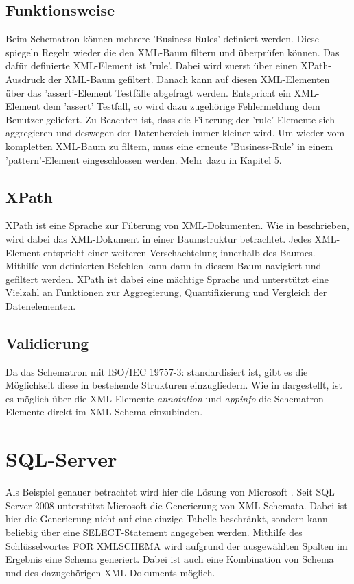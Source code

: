 \subsection{Funktionsweise}
Beim Schematron können mehrere 'Business-Rules' definiert werden. Diese spiegeln Regeln wieder die den XML-Baum filtern und überprüfen können. Das dafür definierte XML-Element ist 'rule'. Dabei wird zuerst über einen XPath-Ausdruck der XML-Baum gefiltert. Danach kann auf diesen XML-Elementen über das 'assert'-Element Testfälle abgefragt werden. Entspricht ein XML-Element dem 'assert' Testfall, so wird dazu zugehörige Fehlermeldung dem Benutzer geliefert.
Zu Beachten ist, dass die Filterung der 'rule'-Elemente sich aggregieren und deswegen der Datenbereich immer kleiner wird.
Um wieder vom kompletten XML-Baum zu filtern, muss eine erneute 'Business-Rule' in einem 'pattern'-Element eingeschlossen werden. Mehr dazu in \cite{Montero2011} Kapitel 5.


\subsection{XPath}
\label{sec:XPath}
XPath ist eine Sprache zur Filterung von XML-Dokumenten. Wie in \cite{Kay2011} beschrieben, wird dabei das XML-Dokument in einer Baumstruktur betrachtet. Jedes XML-Element entspricht einer weiteren Verschachtelung innerhalb des Baumes. Mithilfe von definierten Befehlen kann dann in diesem Baum navigiert und gefiltert werden. XPath ist dabei eine mächtige Sprache und unterstützt eine Vielzahl an Funktionen zur Aggregierung, Quantifizierung und Vergleich der Datenelementen. 


\subsection{Validierung}
Da das Schematron mit ISO/IEC 19757-3: \cite{ISO_IEC19757} standardisiert ist, gibt es die Möglichkeit diese in bestehende Strukturen einzugliedern. Wie in \cite{Akhilesh_validatinga} dargestellt, ist es möglich über die XML Elemente \emph{annotation} und \emph{appinfo} die Schematron-Elemente direkt im XML Schema einzubinden.

\section{SQL-Server}
Als Beispiel genauer betrachtet wird hier die Lösung von Microsoft \cite{SqlServer}. Seit SQL Server 2008 unterstützt Microsoft die Generierung von XML Schemata. Dabei ist hier die Generierung nicht auf eine einzige Tabelle beschränkt, sondern kann beliebig über eine SELECT-Statement angegeben werden. 
Mithilfe des Schlüsselwortes FOR XMLSCHEMA wird aufgrund der ausgewählten Spalten im Ergebnis eine Schema generiert.
Dabei ist auch eine Kombination von Schema und des dazugehörigen XML Dokuments möglich.

